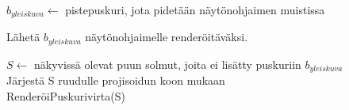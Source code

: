 \perusalgoritmi


$b_{yleiskuva} \gets$ pistepuskuri, jota pidetään näytönohjaimen muistissa


Lähetä $b_{yleiskuva}$ näytönohjaimelle renderöitäväksi.

$S \gets$ näkyvissä olevat puun solmut, joita ei lisätty puskuriin $b_{yleiskuva}$\\
Järjestä S ruudulle projisoidun koon mukaan\\
RenderöiPuskurivirta(S)
